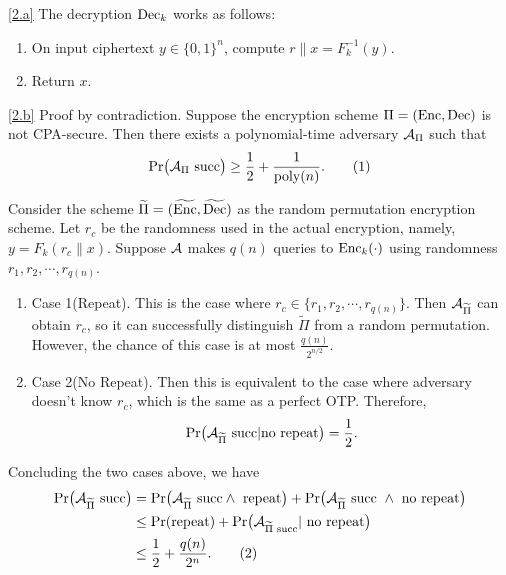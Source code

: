 \documentclass{homework}
\begin{document}
\begin{solution}

  \ref{2.a}
  The decryption $\mathrm{Dec}_{k}$ works as follows:
  \begin{enumerate}
    \item On input ciphertext $y \in {\{0,1\}}^{n}$, compute $r \| x = F^{-1}_{k}(y)$.
    \item Return $x$.
  \end{enumerate}

  \ref{2.b}
  Proof by contradiction. Suppose the encryption scheme $\Pi = (\mathrm{Enc}, \mathrm{Dec})$
  is not CPA-secure. Then there exists a polynomial-time adversary
  $\mathcal{A}_{\Pi}$ such that
  \begin{equation*}
    \Pr \bigl(\mathcal{A}_{\Pi} \text{ succ} \bigr)
    \ge \frac{1}{2} + \frac{1}{\mathrm{poly}(n)}. \tag{1}
  \end{equation*}

  Consider the scheme $\widetilde{\Pi} = (\widetilde{\mathrm{Enc}}, \widetilde{\mathrm{Dec}})$ as the random
  permutation encryption scheme. Let $r_c$ be the randomness used in the actual
  encryption, namely, $y = F_k(r_c \| x)$. Suppose $\mathcal{A}$ makes $q(n)$ queries to $\mathrm{Enc}_k(\cdot)$
  using randomness $r_1, r_2, \cdots, r_{q(n)}$.

  \begin{enumerate}
    \item Case 1(Repeat). This is the case where $r_c \in \{r_1, r_2, \cdots, r_{q(n)}\}$.
          Then $\mathcal{A}_{\widetilde{\Pi}}$ can obtain $r_c$, so it can successfully
          distinguish $\widetilde{\Pi}$ from a random permutation. However,
          the chance of this case is at most $\frac{q(n)}{2^{n/2}}$.
    \item Case 2(No Repeat). Then this is equivalent to the case where adversary
          doesn't know $r_c$, which is the same as a perfect OTP. Therefore,
          \begin{equation*}
            \Pr \bigl(\mathcal{A}_{\widetilde{\Pi}} \text{ succ} | \text{no repeat} \bigr)
            = \frac{1}{2}.
          \end{equation*}
  \end{enumerate}

  Concluding the two cases above, we have
  \begin{align*}
    \Pr \bigl( \mathcal{A}_{\widetilde{\Pi}} \text{ succ} \bigr)
    & = \Pr \bigl(\mathcal{A}_{\widetilde{\Pi}} \text{ succ} \land
      \text{ repeat} \bigr) + \Pr \bigl(\mathcal{A}_{\widetilde{\Pi}} \text{ succ }
      \land \text{ no repeat} \bigr) \\
    & \le \Pr (\text{repeat}) +
      \Pr \bigl(\mathcal{A}_{\widetilde{\Pi} \text{ succ}} | \text{ no
      repeat} \bigr) \\
    & \le \frac{1}{2} + \frac{q(n)}{2^n}. \tag{2}
  \end{align*}


\end{solution}
\end{document}
